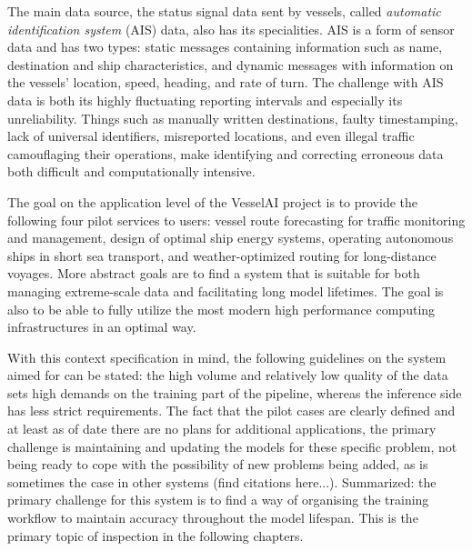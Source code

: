 The main data source, the status signal data sent by vessels, called \textit{automatic identification system} (AIS) data, also has its specialities. AIS is a form of sensor data and has two types: static messages containing information such as name, destination and ship characteristics, and dynamic messages with information on the vessels' location, speed, heading, and rate of turn. The challenge with AIS data is both its highly fluctuating reporting intervals and especially its unreliability.  Things such as manually written destinations, faulty timestamping, lack of universal identifiers, misreported locations, and even illegal traffic camouflaging their operations, make identifying and correcting erroneous data both difficult and computationally intensive.

The goal on the application level of the VesselAI project is to provide the following four pilot services to users: vessel route forecasting for traffic monitoring and management, design of optimal ship energy systems, operating autonomous ships in short sea transport, and weather-optimized routing for long-distance voyages. More abstract goals are to find a system that is suitable for both managing extreme-scale data and facilitating long model lifetimes. The goal is also to be able to fully utilize the most modern high performance computing infrastructures in an optimal way.

With this context specification in mind, the following guidelines on the system aimed for can be stated: the high volume and relatively low quality of the data sets high demands on the training part of the pipeline, whereas the inference side has less strict requirements. The fact that the pilot cases are clearly defined and at least as of date there are no plans for additional applications, the primary challenge is maintaining and updating the models for these specific problem, not being ready to cope with the possibility of new problems being added, as is sometimes the case in other systems (find citations here...).  Summarized: the primary challenge for this system is to find a way of organising the training workflow to maintain accuracy throughout the model lifespan. This is the primary topic of inspection in the following chapters.




